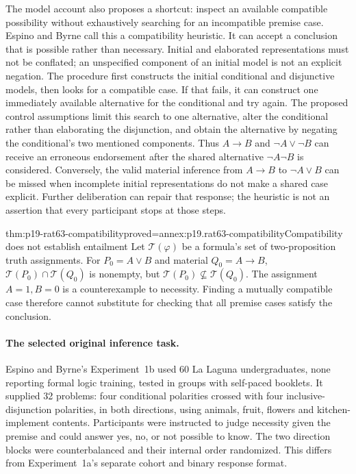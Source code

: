 The model account also proposes a shortcut: inspect an available
compatible possibility without exhaustively searching for an incompatible
premise case. Espino and Byrne call this a compatibility heuristic.
It can accept a conclusion that is possible rather than necessary.
Initial and elaborated representations must not be conflated; an
unspecified component of an initial model is not an explicit negation.
The procedure first constructs the initial conditional and disjunctive
models, then looks for a compatible case. If that fails, it can construct
one immediately available alternative for the conditional and try again.
The proposed control assumptions limit this search to one alternative,
alter the conditional rather than elaborating the disjunction, and
obtain the alternative by negating the conditional's two mentioned
components. Thus \(A\to B\) and \(\neg A\lor\neg B\) can receive
an erroneous endorsement after the shared alternative \(\neg A\neg B\)
is considered. Conversely, the valid material inference from
\(A\to B\) to \(\neg A\lor B\) can be missed when incomplete
initial representations do not make a shared case explicit. Further
deliberation can repair that response; the heuristic is not an assertion
that every participant stops at those steps.
\cite[Secs.~2.1--2.3, pp.~100--108]{EspinoByrne2013Compatibility}

\begin{hblemma}{thm:p19-rat63-compatibility}{proved=annex:p19.rat63-compatibility}{Compatibility does not establish entailment}
Let \(\mathcal T(\varphi)\) be a formula's set of two-proposition
truth assignments. For \(P_0=A\lor B\) and material
\(Q_0=A\to B\), \(\mathcal T(P_0)\cap\mathcal T(Q_0)\)
is nonempty, but \(\mathcal T(P_0)\nsubseteq\mathcal T(Q_0)\).
The assignment \(A=1,B=0\) is a counterexample to necessity.
Finding a mutually compatible case therefore cannot substitute for
checking that all premise cases satisfy the conclusion.
\end{hblemma}

\paragraph{The selected original inference task.}
Espino and Byrne's Experiment~1b used 60 La Laguna undergraduates,
none reporting formal logic training, tested in groups with self-paced
booklets. It supplied 32 problems: four conditional polarities crossed
with four inclusive-disjunction polarities, in both directions, using
animals, fruit, flowers and kitchen-implement contents. Participants
were instructed to judge necessity given the premise and could answer
yes, no, or not possible to know. The two direction blocks were
counterbalanced and their internal order randomized. This differs
from Experiment~1a's separate cohort and binary response format.
\cite[Secs.~3.1--3.2, pp.~109--112]{EspinoByrne2013Compatibility}

